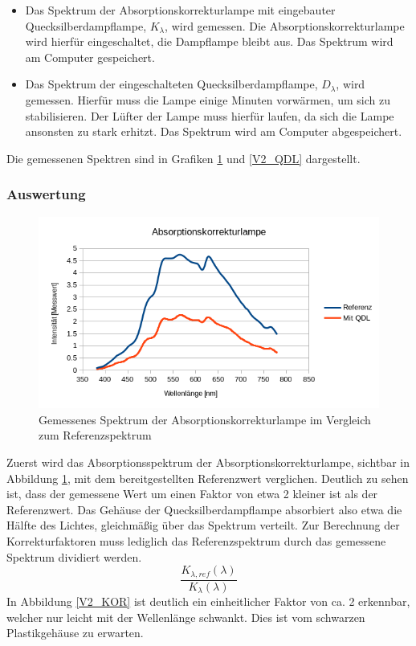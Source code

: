 \begin{itemize}
\item Das Spektrum der Absorptionskorrekturlampe mit eingebauter Quecksilberdampflampe, $K_\lambda$, wird gemessen. Die Absorptionskorrekturlampe wird hierfür eingeschaltet, die Dampflampe bleibt aus. Das Spektrum wird am Computer gespeichert.
\item Das Spektrum der eingeschalteten Quecksilberdampflampe, $D_\lambda$, wird gemessen. Hierfür muss die Lampe einige Minuten vorwärmen, um sich zu stabilisieren. Der Lüfter der Lampe muss hierfür laufen, da sich die Lampe ansonsten zu stark erhitzt. Das Spektrum wird am Computer abgespeichert.
\end{itemize}
Die gemessenen Spektren sind in Grafiken \ref{V2_AKL} und \ref{V2_QDL} dargestellt.

\subsubsection{Auswertung}

\begin{figure}[h]
	\centering
	\includegraphics[scale=0.8]{Images/V2_AKL.png}
	\caption{Gemessenes Spektrum der Absorptionskorrekturlampe im Vergleich zum Referenzspektrum}
	\label{V2_AKL}
\end{figure}

Zuerst wird das Absorptionsspektrum der Absorptionskorrekturlampe, sichtbar in Abbildung \ref{V2_AKL}, mit dem bereitgestellten Referenzwert verglichen. Deutlich zu sehen ist, dass der gemessene Wert um einen Faktor von etwa 2 kleiner ist als der Referenzwert. Das Gehäuse der Quecksilberdampflampe absorbiert also etwa die Hälfte des Lichtes, gleichmäßig über das Spektrum verteilt.
Zur Berechnung der Korrekturfaktoren muss lediglich das Referenzspektrum durch das gemessene Spektrum dividiert werden.
\begin{equation}
\frac{K_{\lambda,ref}(\lambda)}{K_{\lambda}(\lambda)}
\end{equation}
In Abbildung \ref{V2_KOR} ist deutlich ein einheitlicher Faktor von ca. 2 erkennbar, welcher nur leicht mit der Wellenlänge schwankt. Dies ist vom schwarzen Plastikgehäuse zu erwarten.

